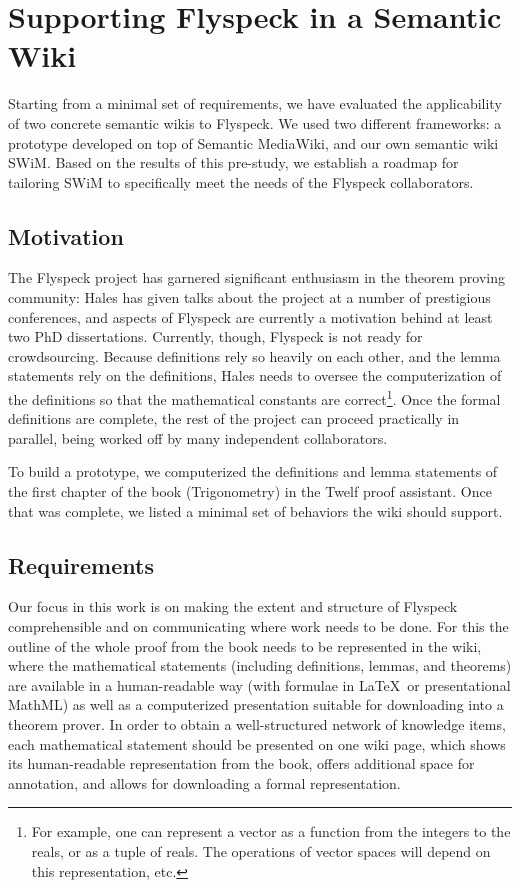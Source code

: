 
\section{Supporting Flyspeck in a Semantic Wiki}

Starting from a minimal set of requirements, we have evaluated the
applicability of two concrete semantic wikis to Flyspeck.  We used two
different frameworks: a prototype developed on top of Semantic
MediaWiki, and our own semantic wiki SWiM.  Based on the results of
this pre-study, we establish a roadmap for tailoring SWiM to
specifically meet the needs of the Flyspeck collaborators.

\subsection{Motivation}
\label{sec:req}

The Flyspeck project has garnered significant enthusiasm in the theorem proving
community: Hales has given talks about the project at a number of prestigious
conferences, and aspects of Flyspeck are currently a motivation behind at least
two PhD dissertations.  Currently, though, Flyspeck is not ready for
crowdsourcing.  Because definitions rely so heavily on each other, and the lemma
statements rely on the definitions, Hales needs to oversee the computerization
of the definitions so that the mathematical constants are correct\footnote{For
  example, one can represent a vector as a function from the integers to the
  reals, or as a tuple of reals.  The operations of vector spaces will depend on
  this representation, etc.}.  Once the formal definitions are complete, the
rest of the project can proceed practically in parallel, being worked off by
many independent collaborators.

To build a prototype, we computerized the definitions and lemma statements of
the first chapter of the book (Trigonometry) in the
Twelf\cite{Schurmann:1999:Twelf} proof assistant.  Once that was complete, we
listed a minimal set of behaviors the wiki should support.

\subsection{Requirements}

Our focus in this work is on making the extent and structure of
Flyspeck comprehensible and on communicating where work needs to be
done.  For this the outline of the whole proof from the
book\cite{Hales:2007:FlyspeckBook} needs to be represented in the
wiki, where the mathematical statements (including definitions,
lemmas, and theorems) are available in a human-readable way (with
formulae in \LaTeX\ or presentational MathML) as well as a
computerized presentation suitable for downloading into a theorem
prover.  In order to obtain a well-structured network of knowledge
items, each mathematical statement should be presented on one wiki
page, which shows its human-readable representation from the book,
offers additional space for annotation, and allows for downloading a
formal representation.  

